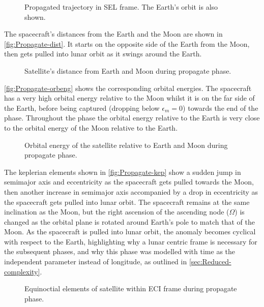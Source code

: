 \begin{figure}
\centering
\def\svgwidth{\figurewidth}

\caption{Propagated trajectory in SEL frame. The Earth's orbit is also shown.}
\label{fig:Propagate-3D-sel}
\end{figure}

The spacecraft's distances from the Earth and the Moon are shown in \autoref{fig:Propagate-dist}. It starts on the opposite side of the Earth from the Moon, then gets pulled into lunar orbit as it swings around the Earth. 

\begin{figure}
\centering
\def\svgwidth{\figurewidth}

\caption{Satellite's distance from Earth and Moon during propagate phase.}
\label{fig:Propagate-dist}
\end{figure}

\autoref{fig:Propagate-orbeng} shows the corresponding orbital energies. The spacecraft has a very high orbital energy relative to the Moon whilst it is on the far side of the Earth, before being captured (dropping below $\epsilon_m=0$) towards the end of the phase. Throughout the phase the orbital energy relative to the Earth is very close to the orbital energy of the Moon relative to the Earth.

\begin{figure}
\centering
\def\svgwidth{\figurewidth}

\caption{Orbital energy of the satellite relative to Earth and Moon during propagate phase.}
\label{fig:Propagate-orbeng}
\end{figure}

The keplerian elements shown in \autoref{fig:Propagate-kep} show a sudden jump in semimajor axis and eccentricity as the spacecraft gets pulled towards the Moon, then another increase in semimajor axis accompanied by a drop in eccentricity as the spacecraft gets pulled into lunar orbit. The spacecraft remains at the same inclination as the Moon, but the right ascension of the ascending node ($\Omega$) is changed as the orbital plane is rotated around Earth's pole to match that of the Moon. As the spacecraft is pulled into lunar orbit, the anomaly becomes cyclical with respect to the Earth, highlighting why a lunar centric frame is necessary for the subsequent phases, and why this phase was modelled with time as the independent parameter instead of longitude, as outlined in \autoref{sec:Reduced-complexity}.

\begin{figure}
\centering
\def\svgwidth{\figurewidth}

\caption{Equinoctial elements of satellite within ECI frame during propagate phase.}
\label{fig:Propagate-mee}
\end{figure}

